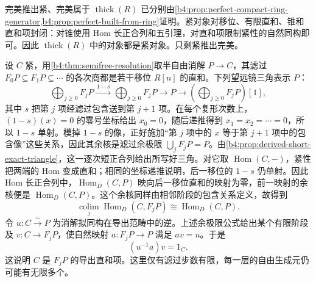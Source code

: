 \begin{proofsketch}
	完美推出紧、完美属于 \(\operatorname{thick}(R)\) 已分别由\cref{b4:prop:perfect-compact-ring-generator,b4:prop:perfect-built-from-ring}证明。紧对象对移位、有限直和、锥和直和项封闭：对锥使用 Hom 长正合列和五引理，对直和项限制紧性的自然同构即可。因此 \(\operatorname{thick}(R)\) 中的对象都是紧对象。只剩紧推出完美。

	设 \(C\) 紧，用\cref{b4:thm:semifree-resolution}取半自由消解 \(P\to C\)，其滤过 \(F_0P\subseteq F_1P\subseteq\cdots\) 的各次商都是若干移位 \(R[n]\) 的直和。下列望远镜三角表示 \(P\)：
	\[
		\bigoplus_{j\ge0}F_jP\xrightarrow{\,1-s\,} \bigoplus_{j\ge0}F_jP\longrightarrow P \longrightarrow\left(\bigoplus_{j\ge0}F_jP\right)[1],
	\]
	其中 \(s\) 把第 \(j\) 项经滤过包含送到第 \(j+1\) 项。在每个复形次数上，\((1-s)(x)=0\) 的零号坐标给出 \(x_0=0\)，随后递推得到 \(x_1=x_2=\cdots=0\)，所以 \(1-s\) 单射。模掉 \(1-s\) 的像，正好施加“第 \(j\) 项中的 \(x\) 等于第 \(j+1\) 项中的包含像”这些关系，因此其余核是滤过余极限 \(\bigcup_jF_jP=P\)。由\cref{b4:prop:derived-short-exact-triangle}，这一逐次短正合列给出所写好三角。对它取 \(\operatorname{Hom}(C,-)\)，紧性把两端的 Hom 变成直和；相同的坐标递推说明，后一移位的 \(1-s\) 仍单射。因此 Hom 长正合列中，\(\operatorname{Hom}_D(C,P)\) 映向后一移位直和的映射为零，前一映射的余核便是 \(\operatorname{Hom}_D(C,P)\)。这个余核同样由相邻阶段的包含关系定义，故得到
	\[
		\operatorname*{colim}_j\operatorname{Hom}_D(C,F_jP) \cong\operatorname{Hom}_D(C,P).
	\]
	令 \(u:C\xrightarrow{\sim}P\) 为消解拟同构在导出范畴中的逆。上述余极限公式给出某个有限阶段及 \(v:C\to F_jP\)，使自然映射 \(a:F_jP\to P\) 满足 \(av=u\)。于是
	\[
		(u^{-1}a)v=1_C.
	\]
	这说明 \(C\) 是 \(F_jP\) 的导出直和项。这里仅有滤过步数有限，每一层的自由生成元仍可能有无限多个。


\end{proofsketch}
